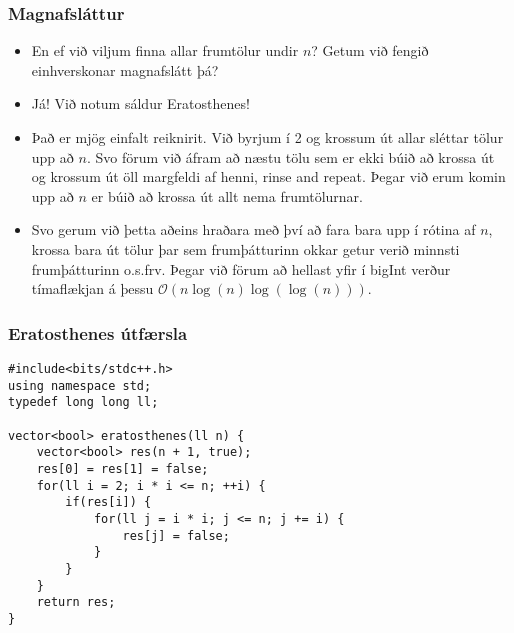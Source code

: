 \documentclass{beamer}
\begin{document}
\begin{frame}
\frametitle{Magnafsláttur}

\begin{itemize}

\item<1-> En ef við viljum finna allar frumtölur undir $n$? Getum við fengið einhverskonar magnafslátt þá?

\item<2-> Já! Við notum sáldur Eratosthenes!

\item<3-> Það er mjög einfalt reiknirit. Við byrjum í 2 og krossum út allar sléttar tölur upp að $n$. Svo förum við áfram að næstu tölu sem er ekki búið að krossa út og krossum út öll margfeldi af henni, rinse and repeat. Þegar við erum komin upp að $n$ er búið að krossa út allt nema frumtölurnar.

\item<4-> Svo gerum við þetta aðeins hraðara með því að fara bara upp í rótina af $n$, krossa bara út tölur þar sem frumþátturinn okkar getur verið minnsti frumþátturinn o.s.frv. Þegar við förum að hellast yfir í bigInt verður tímaflækjan á þessu $\mathcal{O}(n\log(n)\log(\log(n)))$.

\end{itemize}

\end{frame}

\begin{frame}[fragile]
\frametitle{Eratosthenes útfærsla}

\begin{small}
\begin{verbatim}
#include<bits/stdc++.h>
using namespace std;
typedef long long ll;

vector<bool> eratosthenes(ll n) {
    vector<bool> res(n + 1, true);
    res[0] = res[1] = false;
    for(ll i = 2; i * i <= n; ++i) {
        if(res[i]) {
            for(ll j = i * i; j <= n; j += i) {
                res[j] = false;
            }
        }
    }
    return res;
}
\end{verbatim}
\end{small}

\end{frame}
\end{document}

